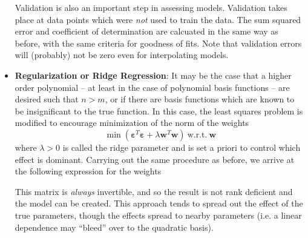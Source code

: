 \documentclass[11pt]{article}
\newcommand{\Item}[1]{\item \textbf{#1}:}
\newcommand{\CenteredBoxed}[1]{\begin{center}\boxed{#1}\end{center}}
\begin{document}
\begin{itemize}
Validation is also an important step in assessing models. Validation takes place at data points which were \emph{not} used to train the data. The sum squared error and coefficient of determination are calcuated in the same way as before, with the same criteria for goodness of fits. Note that validation errors will (probably) not be zero even for interpolating models.
\Item{Regularization or Ridge Regression} It may be the case that a higher order polynomial -- at least in the case of polynomial basis functions -- are desired such that $n>m$, or if there are basis functions which are known to be insignificant to the true function. In this case, the least squares problem is modified to encourage minimization of the norm of the weights
$$\min\left(\bm{\varepsilon}^T\bm{\varepsilon} + \lambda\bm{w}^T\bm{w}\right)\ \mathrm{w.r.t.}\ \bm{w}$$
where $\lambda>0$ is called the ridge parameter and is set a priori to control which effect is dominant. Carrying out the same procedure as before, we arrive at the following expression for the weights
\CenteredBoxed{\bm{w}=\left(\Phi^T\Phi+\lambda\mathbb{I}\right)^{-1}\Phi^T\bm{f}}
This matrix is \emph{always} invertible, and so the result is not rank deficient and the model can be created. This approach tends to spread out the effect of the true parameters, though the effects spread to nearby parameters (i.e. a linear dependence may ``bleed'' over to the quadratic basis).
\end{itemize}
\end{document}
